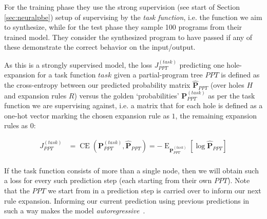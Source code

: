\documentclass{article}
\begin{document}
For the training phase they use the strong supervision (see start of Section \ref{sec:neuralpbe})
setup of supervising by the \emph{task function},
i.e. the function we aim to synthesize,
while for the test phase they sample 100 programs from their trained model.
They consider the synthesized program to have passed if any of these demonstrate the correct behavior on the input/output.

As this is a strongly supervised model,
the loss $J^{(task)}_{PPT}$ predicting one hole-expansion for a task function $task$ given a
partial-program tree $PPT$ is defined as the cross-entropy between our predicted probability matrix
$\mathbf{\hat{P}}_{PPT}$ (over holes $H$ and expansion rules $R$)
versus the golden `probabilities' $\mathbf{P}^{(task)}_{PPT}$ as per the task function we are supervising against,
i.e. a matrix that for each hole is defined as a one-hot vector marking the chosen expansion rule as $1$,
the remaining expansion rules as $0$:

\begin{align*}
J^{(task)}_{PPT} &= \operatorname{CE}(\mathbf{P}^{(task)}_{PPT},\mathbf{\hat{P}}_{PPT}) = -\operatorname{E}_{\mathbf{P}^{(task)}_{PPT}}[\log \mathbf{\hat{P}}_{PPT}] \\
\end{align*}

If the task function consists of more than a single node, then we will obtain such a loss for every such prediction step (each starting from their own $PPT$).
Note that the $PPT$ we start from in a prediction step is carried over to inform our next rule expansion.
Informing our current prediction using previous predictions in such a way makes the model \emph{autoregressive}~\citep{kendall1944autoregressive}.
\end{document}
